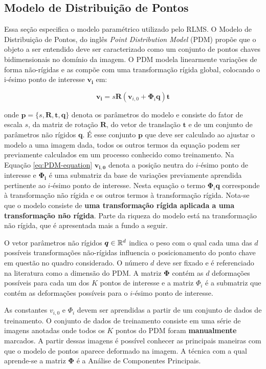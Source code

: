 {\subsection{Modelo de Distribuição de Pontos}

Essa seção especifica o modelo paramétrico utilizado pelo RLMS. O Modelo de
Distribuição de Pontos, do inglês  \textit{Point Distribution Model} (PDM) propõe que o objeto a ser
entendido deve ser caracterizado como um conjunto de pontos chaves
bidimensionais no domínio da imagem. O PDM modela linearmente variações de forma
não-rígidas e as compõe com uma transformação rígida global, colocando o i-ésimo
ponto de interesse $\bm{v_i}$ em:

\begin{equation}
 \bm{v_i} = s \bm{R} ( \bm{v}_{i,0} + \bm{\Phi}_i \bm{q}) \bm{t}
\label{eq:PDM-equation}
\end{equation}
 
onde $\mathbf{p}=\{s,\bm{R},\bm{t},\bm{q}\}$ denota os parâmetros do modelo e
consiste do fator de escala $s$, da matriz de rotação $\bm{R}$, do vetor de
translação $\bm{t}$ e de um conjunto de parâmetros não rígidos $\bm{q}$. É esse
conjunto $\mathbf{p}$ que deve ser calculado ao ajustar o modelo a uma imagem
dada, todos os outros termos da equação podem ser previamente calculados em um
processo conhecido como treinamento.  Na Equação \ref{eq:PDM-equation}
$\bm{v_{i,0}}$ denota a posição neutra do $i$-ésimo ponto de interesse e
$\bm{\Phi_i}$ é uma submatriz da base de variações previamente aprendida
pertinente ao $i$-ésimo ponto de interesse.  Nesta equação o termo $\bm{\Phi}_i
\bm{q}$ corresponde à transformação não rígida e os outros termos à
transformação rígida. Nota-se que o modelo consiste de \textbf{uma transformação
rígida aplicada a uma transformação não rígida}. Parte da riqueza do modelo está
na transformação não rígida, que é apresentada mais a fundo a seguir.

O vetor parâmetros não rígidos $\bm{q} \in \mathbb{R} ^d$ indica o peso com o
qual cada uma das $d$ possíveis transformações não-rígidas influencia o
posicionamento do ponto chave em questão no quadro considerado. O número $d$
deve ser fixado e é referenciado na literatura como a dimensão do PDM. A matriz
$\bm{\Phi}$ contém as $d$ deformações possíveis para cada um dos $K$ pontos de
interesse e a matriz $\Phi_i$ é a submatriz que contém as deformações possíveis
para o $i$-ésimo ponto de interesse.

As constantes $v_{i,0}$ e $\Phi_i$ devem ser aprendidas a partir de um conjunto
de dados de treinamento. O conjunto de dados de treinamento consiste em uma
série de imagens anotadas onde todos os $K$ pontos do PDM foram
\textbf{manualmente} marcados. A partir dessas imagens é possível conhecer as
principais maneiras com que o modelo de pontos aparece deformado na imagem. A
técnica com a qual aprende-se a matriz $\bm{\Phi}$ é a Análise de Componentes
Principais.

}
